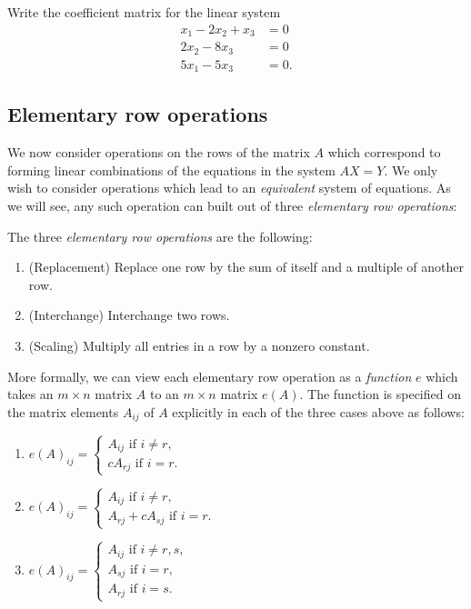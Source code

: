 \documentclass[12pt,letterpaper,reqno]{article}
\numberwithin{equation}{section}
\newcommand{\ti}[1]{\textit{#1}}
\begin{document}
\begin{exercise}
	Write the coefficient matrix for the linear system
\begin{align*}
		x_1-2x_2+x_3&=0 \\
		2x_2-8x_3 &=0 \\
		5x_1-5x_3 &=0.
	\end{align*}
\end{exercise}

\subsection{Elementary row operations}
We now consider operations on the rows of the matrix $A$ which correspond to forming linear combinations of the equations in the system $AX=Y$. 
	We only wish to consider operations which lead to an \ti{equivalent} system of equations.
	As we will see, any such operation can built out of three \ti{elementary row operations}:
\begin{defn} \label{def:elementary_row_operations}
The three \ti{elementary row operations} are the following:
\begin{enumerate}
	\item (Replacement) Replace one row by the sum of itself and a multiple of another row.
	\item (Interchange) Interchange two rows.
	\item (Scaling) Multiply all entries in a row by a nonzero constant.
\end{enumerate}	
\end{defn}

More formally, we can view each elementary row operation as a \emph{function} $e$ which takes an $m \times n$ matrix $A$ to an $m \times n$ matrix $e(A)$. The function is specified on the matrix elements $A_{ij}$ of $A$ explicitly in each of the three cases above as follows:

\begin{enumerate}
	\item $e(A)_{ij}=\begin{cases}
		A_{ij} \text{ if } i \neq r, \\
		cA_{rj} \text{ if } i = r.
	\end{cases}$
	\item $e(A)_{ij}=\begin{cases}
		A_{ij} \text{ if } i \neq r, \\
		A_{rj}+c A_{sj} \text{ if } i = r.
	\end{cases}$
	\item $e(A)_{ij}=\begin{cases}
		A_{ij} \text{ if } i \neq r,s, \\
		A_{sj} \text{ if } i = r, \\
		A_{rj} \text{ if } i=s.
	\end{cases}$
\end{enumerate}
\end{document}
